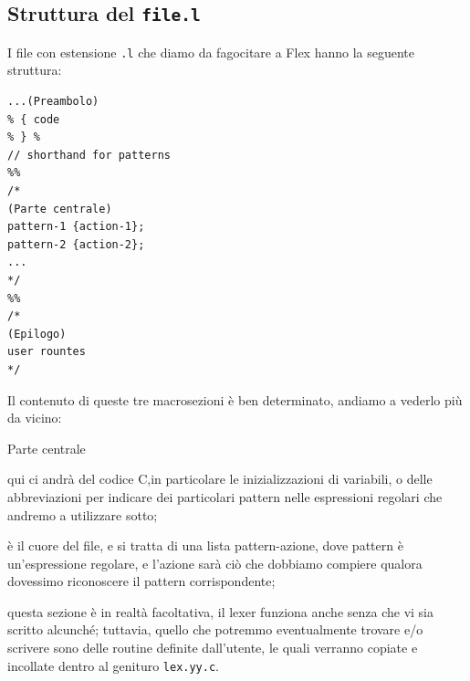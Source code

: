 \documentclass[class=book, crop=false, oneside, 12pt]{standalone}
\begin{document}
\subsection{Struttura del \texttt{file.l}}
I file con estensione \texttt{.l} che diamo da fagocitare a Flex hanno la seguente struttura:
\begin{verbatim}
...(Preambolo)
% { code
% } %
// shorthand for patterns
%%
/*
(Parte centrale)
pattern-1 {action-1};
pattern-2 {action-2};
...
*/
%%
/*
(Epilogo)
user rountes
*/
\end{verbatim}
Il contenuto di queste tre macrosezioni è ben determinato, andiamo a vederlo più da vicino:
\begin{labeling}{Parte centrale}
    \item[Preambolo] qui ci andrà del codice C,in particolare le inizializzazioni di variabili, o delle abbreviazioni per indicare dei particolari pattern nelle espressioni regolari che andremo a utilizzare sotto;
    \item[Parte centrale] è il cuore del file, e si tratta di una lista pattern-azione, dove pattern è un'espressione regolare, e l'azione sarà ciò che dobbiamo compiere qualora dovessimo riconoscere il pattern corrispondente;
    \item[Epilogo] questa sezione è in realtà facoltativa, il lexer funziona anche senza che vi sia scritto alcunché; tuttavia, quello che potremmo eventualmente trovare e/o scrivere sono delle routine definite dall'utente, le quali verranno copiate e incollate dentro al genituro \texttt{lex.yy.c}.
\end{labeling}
\end{document}
